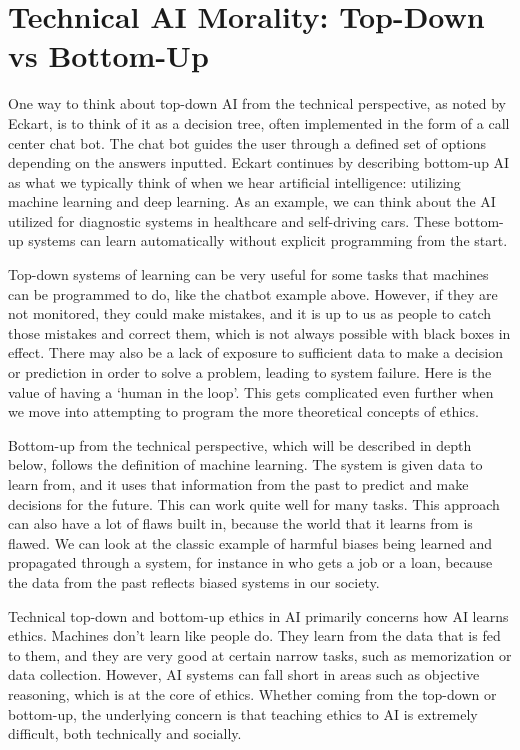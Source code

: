 \documentclass{svproc}
\begin{document}
\section{Technical AI Morality: Top-Down vs Bottom-Up}

One way to think about top-down AI from the technical perspective, as noted by Eckart, \cite{Eckart2020Top-downAI} is to think of it as a decision tree, often implemented in the form of a call center chat bot. The chat bot guides the user through a defined set of options depending on the answers inputted. Eckart continues by describing bottom-up AI as what we typically think of when we hear artificial intelligence: utilizing machine learning and deep learning. As an example, we can think about the AI utilized for diagnostic systems in healthcare and self-driving cars. These bottom-up systems can learn automatically without explicit programming from the start. \cite{Eckart2020Top-downAI}

Top-down systems of learning can be very useful for some tasks that machines can be programmed to do, like the chatbot example above. However, if they are not monitored, they could make mistakes, and it is up to us as people to catch those mistakes and correct them, which is not always possible with black boxes in effect. There may also be a lack of exposure to sufficient data to make a decision or prediction in order to solve a problem, leading to system failure. Here is the value of having a ‘human in the loop’. This gets complicated even further when we move into attempting to program the more theoretical concepts of ethics.

Bottom-up from the technical perspective, which will be described in depth below, follows the definition of machine learning. The system is given data to learn from, and it uses that information from the past to predict and make decisions for the future. This can work quite well for many tasks. This approach can also have a lot of flaws built in, because the world that it learns from is flawed. We can look at the classic example of harmful biases being learned and propagated through a system, for instance in who gets a job or a loan, because the data from the past reflects biased systems in our society. \cite{Martin2019EthicalAlgorithms}

Technical top-down and bottom-up ethics in AI primarily concerns how AI learns ethics. Machines don’t learn like people do. They learn from the data that is fed to them, and they are very good at certain narrow tasks, such as memorization or data collection. However, AI systems can fall short in areas such as objective reasoning, which is at the core of ethics. Whether coming from the top-down or bottom-up, the underlying concern is that teaching ethics to AI is extremely difficult, both technically and socially. 
\end{document}
